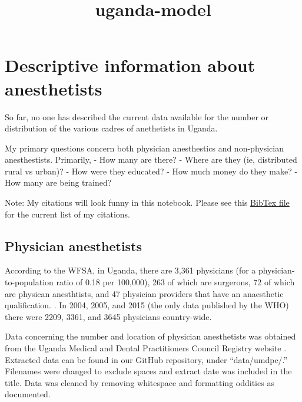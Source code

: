 \documentclass[11pt]{article}
\title{uganda-model}
\begin{document}
    
    
    \maketitle
    
    

    
    \hypertarget{descriptive-information-about-anesthetists}{%
\section{Descriptive information about
anesthetists}\label{descriptive-information-about-anesthetists}}

So far, no one has described the current data available for the number
or distribution of the various cadres of anethetists in Uganda.

My primary questions concern both physician anesthestics and
non-physician anesthestists. Primarily, - How many are there? - Where
are they (ie, distributed rural vs urban)? - How were they educated? -
How much money do they make? - How many are being trained?

Note: My citations will look funny in this notebook. Please see this
\href{https://github.com/alexgoodell/uganda-model/blob/master/refs/library.bib}{BibTex
file} for the current list of my citations.

\hypertarget{physician-anesthetists}{%
\subsection{Physician anesthetists}\label{physician-anesthetists}}

According to the WFSA, in Uganda, there are 3,361 physicians (for a
physician-to-population ratio of 0.18 per 100,000), 263 of which are
surgerons, 72 of which are physican anesthtists, and 47 physician
providers that have an anaesthetic qualification. \cite{wfsaug2018}. In
2004, 2005, and 2015 (the only data published by the WHO) there were
2209, 3361, and 3645 physicians country-wide. \cite{whogho2018}

Data concerning the number and location of physician anesthetists was
obtained from the Uganda Medical and Dental Practitioners Council
Registry website \cite{umdpc2018reg}. Extracted data can be found in our
GitHub repository, under ``data/umdpc/.'' Filenames were changed to
exclude spaces and extract date was included in the title. Data was
cleaned by removing whitespace and formatting oddities as documented.
\end{document}
